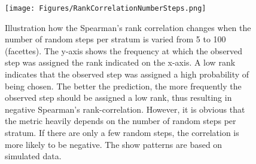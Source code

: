 \documentclass[abstract=on,10pt,a4paper,bibliography=totocnumbered]{article}
\begin{document}
\begin{figure}[htbp]
 \begin{center}
  \texttt{[image: Figures/RankCorrelationNumberSteps.png]}
  \caption{Illustration how the Spearman's rank correlation changes when the
  number of random steps per stratum is varied from 5 to 100 (facettes). The
  y-axis shows the frequency at which the observed step was assigned the rank
  indicated on the x-axis. A low rank indicates that the observed step was
  assigned a high probability of being chosen. The better the prediction, the
  more frequently the observed step should be assigned a low rank, thus
  resulting in negative Spearman's rank-correlation. However, it is obvious that
  the metric heavily depends on the number of random steps per stratum. If there
  are only a few random steps, the correlation is more likely to be negative.
  The show patterns are based on simulated data.}
  \label{RankCorrelationNumberSteps}
 \end{center}
\end{figure}

\newpage
\begingroup
\singlespacing
{}
\endgroup
\end{document}
